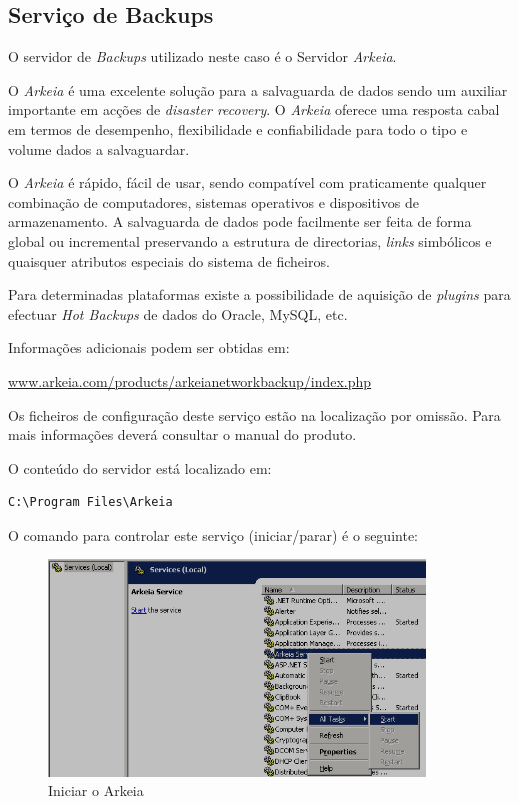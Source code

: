 \subsection{Serviço de Backups}

O servidor de \emph{Backups} utilizado neste caso é o Servidor \emph{Arkeia}.

O \emph{Arkeia} é uma excelente solução para a salvaguarda de dados sendo um auxiliar importante em acções de \emph{disaster recovery}. O \emph{Arkeia} oferece uma resposta cabal em termos de desempenho, flexibilidade e confiabilidade para todo o tipo e volume dados a salvaguardar.

O \emph{Arkeia} é rápido, fácil de usar, sendo compatível com praticamente qualquer combinação de computadores, sistemas operativos e dispositivos de armazenamento. A salvaguarda de dados pode facilmente ser feita de forma global ou incremental preservando a estrutura de directorias, \emph{links} simbólicos e quaisquer atributos especiais do sistema de ficheiros.

Para determinadas plataformas existe a possibilidade de aquisição de \textit{plugins} para efectuar \textit{Hot Backups} de dados do Oracle, MySQL, etc.

Informações adicionais podem ser obtidas em:\\ \begin{normalsize}\sffamily\href{http://www.arkeia.com/products/arkeianetworkbackup/index.php}{www.arkeia.com/products/arkeianetworkbackup/index.php}\end{normalsize}

Os ficheiros de configuração deste serviço estão na localização por omissão. Para mais informações deverá consultar o manual do produto.


O conteúdo do servidor está localizado em:

\begin{Verbatim}
C:\Program Files\Arkeia
\end{Verbatim}

O comando para controlar este serviço (iniciar/parar) é o seguinte:

\begin{figure}[H]
    \begin{center}
        \includegraphics[width=10cm]{include/img/ark-win-start}
    \end{center}
    \caption{Iniciar o Arkeia}
    \label{fig:ARK-WIN1}
\end{figure}


